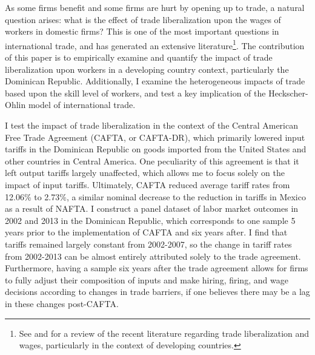 \documentclass[12pt]{article}
\begin{document}
As some firms benefit and some firms are hurt by opening up to trade, a natural question arises:
what is the effect of trade liberalization upon the wages of workers in domestic firms?  
This is one of the most important questions in international trade, and has generated
an extensive literature\footnote{See \citet{feenstraglobal} and \citet{goldberg} for a review
of the recent literature regarding trade liberalization and wages, particularly in the context
of developing countries.}. The contribution of this paper 
is to empirically examine and quantify the impact of trade liberalization upon workers in a
developing country context, particularly the Dominican Republic. Additionally, I examine 
the heterogeneous impacts of trade based upon the skill level of workers, and test a key implication of
the Heckscher-Ohlin model of international trade. 

I test the impact of trade liberalization in the context of the Central American Free Trade Agreement
(CAFTA, or CAFTA-DR), which primarily lowered input tariffs in the Dominican Republic on goods imported from
the United States and other countries in Central America. One peculiarity of this agreement is
that it left output tariffs largely unaffected, which allows me to focus solely on the impact 
of input tariffs. Ultimately, CAFTA reduced average tariff rates from 12.06\% to 2.73\%, a similar 
nominal decrease to the reduction in tariffs in Mexico as a result of NAFTA. I construct a panel
dataset of labor market outcomes in 2002 and 2013 in the Dominican Republic, which corresponds to
one sample 5 years prior to the implementation of CAFTA and six years after. I find that tariffs
remained largely constant from 2002-2007, so the change in tariff rates from 2002-2013 can be
almost entirely attributed solely to the trade agreement. Furthermore, having a sample six years
after the trade agreement allows for firms to fully adjust their composition of inputs and make hiring, firing,
and wage decisions according to changes in trade barriers, if one believes there may be a lag 
in these changes post-CAFTA.
\end{document}
